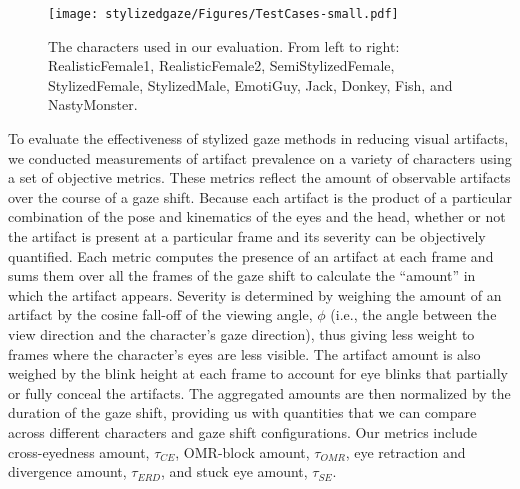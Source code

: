 \begin{figure*}
\centering
\texttt{[image: stylizedgaze/Figures/TestCases-small.pdf]}
\caption{The characters used in our evaluation. From left to right: RealisticFemale1, RealisticFemale2, SemiStylizedFemale, StylizedFemale, StylizedMale, EmotiGuy, Jack, Donkey, Fish, and NastyMonster.}
\label{fig:TestCases}
\end{figure*}

To evaluate the effectiveness of stylized gaze methods in reducing visual artifacts, we conducted measurements of artifact prevalence on a variety of characters using a set of objective metrics. These metrics reflect the amount of observable artifacts over the course of a gaze shift. Because each artifact is the product of a particular combination of the pose and kinematics of the eyes and the head, whether or not the artifact is present at a particular frame and its severity can be objectively quantified. Each metric computes the presence of an artifact at each frame and sums them over all the frames of the gaze shift to calculate the ``amount'' in which the artifact appears. Severity is determined by weighing the amount of an artifact by the cosine fall-off of the viewing angle, $\phi$ (i.e., the angle between the view direction and the character's gaze direction), thus giving less weight to frames where the character's eyes are less visible. The artifact amount is also weighed by the blink height at each frame to account for eye blinks that partially or fully conceal the artifacts. The aggregated amounts are then normalized by the duration of the gaze shift, providing us with quantities that we can compare across different characters and gaze shift configurations. Our metrics include cross-eyedness amount, $\tau_{CE}$, OMR-block amount, $\tau_{OMR}$, eye retraction and divergence amount, $\tau_{ERD}$, and stuck eye amount, $\tau_{SE}$.

